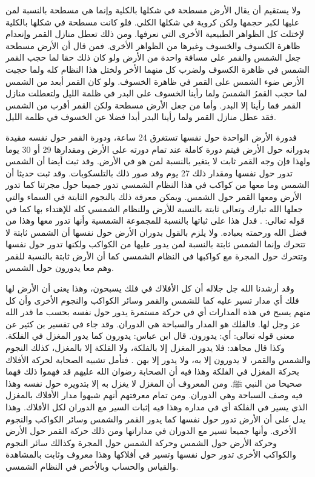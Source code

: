 ولا يستقيم أن يقال الأرض مسطحة في شكلها بالكلية وإنما هي مسطحة بالنسبة لمن عليها لكبر حجمها ولكن كروية في شكلها الكلي. فلو كانت مسطحة في شكلها بالكلية لإختلت كل الظواهر الطبيعية الأخرى التي نعرفها. ومن ذلك تعطل منازل القمر وإنعدام ظاهرة الكسوف والخسوف وغيرها من الظواهر الأخرى. فمن قال أن الأرض مسطحة جعل الشمس والقمر على مسافة واحدة من الأرض ولو كان ذلك حقا لما حجب القمر الشمس في ظاهرة الكسوف ولضرب كل منهما الأخر ولختل هذا النظام كله ولما حجبت الأرض ضوء الشمس على القمر في ظاهرة الخسوف. ولو كان القمر أبعد من الشمس لما حجب القمرُ الشمسَ ولما رأينا الخسوف على البدر في ظلمة الليل ولتعطلت منازل القمر فما رأينا إلا البدر. وأما من جعل الأرض مسطحة ولكن القمر أقرب من الشمس فقد عطل منازل القمر ولما رأينا البدر أبدا فضلا عن الخسوف في ظلمة الليل.

فدورة الأرض الواحدة حول نفسها تستغرق 24 ساعة، ودورة القمر حول نفسه مقيدة بدورانه حول الأرض فيتم دورة كاملة عند تمام دورته على الأرض ومقدارها 29 أو 30 يوما ولهذا فإن وجه القمر ثابت لا يتغير بالنسبة لمن هو في الأرض. وقد ثبت أيضا أن الشمس تدور حول نفسها ومقدار ذلك 27 يوم وقد صور ذلك بالتلسكوبات. وقد ثبت حديثا أن الشمس وما معها من كواكب في هذا النظام الشمسي تدور جميعا حول مجرتنا كما تدور الأرض ومعها القمر حول الشمس. ويمكن معرفة ذلك بالنجوم الثابتة في السماء والتي جعلها الله تبارك وتعالى ثابتة بالنسبة للأرض وللنظام الشمسي كله للإهتداء بها كما في قوله تعالى: \quranayah*[6][97]{\footnotesize (\surahname*[6])}. فدل هذا على ثباتها بالنسبة للمجموعة الشمسية وأنها تدور معها وهذا من فضل الله ورحمته بعباده. ولا يلزم بالقول بدوران الأرض حول نفسها أن الشمس ثابتة لا تتحرك وإنما الشمس ثابتة بالنسبة لمن يدور عليها من الكواكب ولكنها تدور حول نفسها وتتحرك حول المجرة مع كواكبها في النظام الشمسي كما أن الأرض ثابتة بالنسبة للقمر وهم معا يدورون حول الشمس.

وقد أرشدنا الله جل جلاله أن كل الأفلاك في فلك يسبحون، وهذا يعنى أن الأرض لها فلك أي مدار تسير عليه كما للشمس والقمر وسائر الكواكب والنجوم الأخرى وأن كل منهم يسبح في هذه المدارات أي في حركة مستمرة يدور حول نفسه بحسب ما قدر الله عز وجل لها. فالفلك هو المدار والسباحة هي الدوران. وقد جاء في تفسير بن كثير عن معنى قوله تعالى: \quranayah*[36][40][12] {\footnotesize (\surahname*[36])} أي: يدورون. قال ابن عباس: يدورون كما يدور المغزل في الفلكة. وكذا قال مجاهد: فلا يدور المغزل إلا بالفلكة، ولا الفلكة إلا بالمغزل، كذلك النجوم والشمس والقمر، لا يدورون إلا به، ولا يدور إلا بهن \href{https://shamela.ws/book/8473/2750#p4}{\faExternalLink} \cite{tafsir_ibnKathir}. فتأمل تشبيه الصحابة لحركة الأفلاك بحركة المغزل في الفلكة وهذا فيه أن الصحابة رضوان الله عليهم قد فهموا ذلك فهما صحيحا من النبي ﷺ. ومن المعروف أن المغزل لا يغزل به إلا بتدويره حول نفسه وهذا فيه وصف السباحة وهي الدوران. ومن تمام معرفتهم أنهم شبهوا مدار الأفلاك بالمغزل الذي يسير في الفلكة أي في مداره وهذا فيه إثبات السير مع الدوران لكل الأفلاك. وهذا يدل على أن الأرض تدور حول نفسها كما يدور القمر والشمس وسائر الكواكب والنجوم الأخرى. وأنها جميعا تسير مع الدوران في مداراتها ومن ذلك حركة القمر حول الأرض وحركة الأرض حول الشمس وحركة الشمس حول المجرة وكذالك سائر النجوم والكواكب الأخرى تدور حول نفسها وتسير في أفلاكها وهذا معروف وثابت بالمشاهدة والقياس والحساب وبالأخص في النظام الشمسي. 

